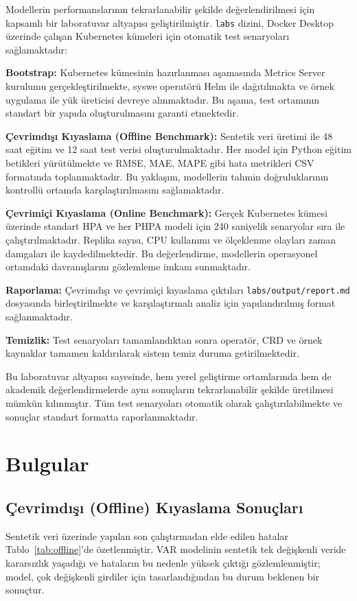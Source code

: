 \documentclass[12pt,a4paper]{article}
\begin{document}
Modellerin performanslarının tekrarlanabilir şekilde değerlendirilmesi için kapsamlı bir laboratuvar altyapısı geliştirilmiştir. \texttt{labs} dizini, Docker Desktop üzerinde çalışan Kubernetes kümeleri için otomatik test senaryoları sağlamaktadır:

\textbf{Bootstrap:} Kubernetes kümesinin hazırlanması aşamasında Metrics Server kurulumu gerçekleştirilmekte, syswe operatörü Helm ile dağıtılmakta ve örnek uygulama ile yük üreticisi devreye alınmaktadır. Bu aşama, test ortamının standart bir yapıda oluşturulmasını garanti etmektedir.

\textbf{Çevrimdışı Kıyaslama (Offline Benchmark):} Sentetik veri üretimi ile 48 saat eğitim ve 12 saat test verisi oluşturulmaktadır. Her model için Python eğitim betikleri yürütülmekte ve RMSE, MAE, MAPE gibi hata metrikleri CSV formatında toplanmaktadır. Bu yaklaşım, modellerin tahmin doğruluklarının kontrollü ortamda karşılaştırılmasını sağlamaktadır.

\textbf{Çevrimiçi Kıyaslama (Online Benchmark):} Gerçek Kubernetes kümesi üzerinde standart HPA ve her PHPA modeli için 240 saniyelik senaryolar sıra ile çalıştırılmaktadır. Replika sayısı, CPU kullanımı ve ölçeklenme olayları zaman damgaları ile kaydedilmektedir. Bu değerlendirme, modellerin operasyonel ortamdaki davranışlarını gözlemleme imkanı sunmaktadır.

\textbf{Raporlama:} Çevrimdışı ve çevrimiçi kıyaslama çıktıları \texttt{labs/output/report.md} dosyasında birleştirilmekte ve karşılaştırmalı analiz için yapılandırılmış format sağlanmaktadır.

\textbf{Temizlik:} Test senaryoları tamamlandıktan sonra operatör, CRD ve örnek kaynaklar tamamen kaldırılarak sistem temiz duruma getirilmektedir.

Bu laboratuvar altyapısı sayesinde, hem yerel geliştirme ortamlarında hem de akademik değerlendirmelerde aynı sonuçların tekrarlanabilir şekilde üretilmesi mümkün kılınmıştır. Tüm test senaryoları otomatik olarak çalıştırılabilmekte ve sonuçlar standart formatta raporlanmaktadır.

\section{Bulgular}
\subsection{Çevrimdışı (Offline) Kıyaslama Sonuçları}
Sentetik veri üzerinde yapılan son çalıştırmadan elde edilen hatalar Tablo~\ref{tab:offline}’de özetlenmiştir. VAR modelinin sentetik tek değişkenli veride kararsızlık yaşadığı ve hataların bu nedenle yüksek çıktığı gözlemlenmiştir; model, çok değişkenli girdiler için tasarlandığından bu durum beklenen bir sonuçtur.
\end{document}
